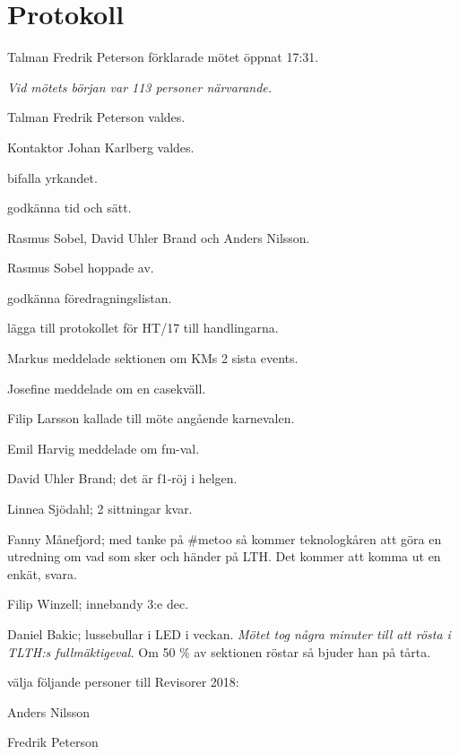 \documentclass[10pt]{article}
\def\mo{Fredrik Peterson}
\def\ms{Johan Karlberg}
\begin{document}
\section*{Protokoll}
\begin{paragrafer}
Talman {\mo} förklarade mötet öppnat 17:31.

\emph{Vid mötets början var 113 personer närvarande.}

Talman {\mo} valdes.

Kontaktor {\ms} valdes.



\Mba bifalla yrkandet.

\Mba godkänna tid och sätt.

Rasmus Sobel, David Uhler Brand och Anders Nilsson.

Rasmus Sobel hoppade av.

\valavj

\emph{\ingaadj}

\Mba godkänna föredragningslistan.

\Mba lägga till protokollet för HT/17 till handlingarna.

Markus meddelade sektionen om KMs 2 sista events.

Josefine meddelade om en casekväll.

Filip Larsson kallade till möte angående karnevalen.

Emil Harvig meddelade om fm-val.

David Uhler Brand; det är f1-röj i helgen.

Linnea Sjödahl; 2 sittningar kvar.

Fanny Månefjord; med tanke på \#metoo så kommer teknologkåren att göra en utredning om vad som sker och händer på LTH. Det kommer att komma ut en enkät, svara.

Filip Winzell; innebandy 3:e dec.

Daniel Bakic; lussebullar i LED i veckan.
\emph{Mötet tog några minuter till att rösta i TLTH:s fullmäktigeval.}
Om 50 \% av sektionen röstar så bjuder han på tårta.

\begin{paralist}
    \Mba välja följande personer till Revisorer 2018:
    \begin{tightdashlist}
        \item Anders Nilsson
        \item Fredrik Peterson
    \end{tightdashlist}


\end{paralist}
\end{paragrafer}
\end{document}
